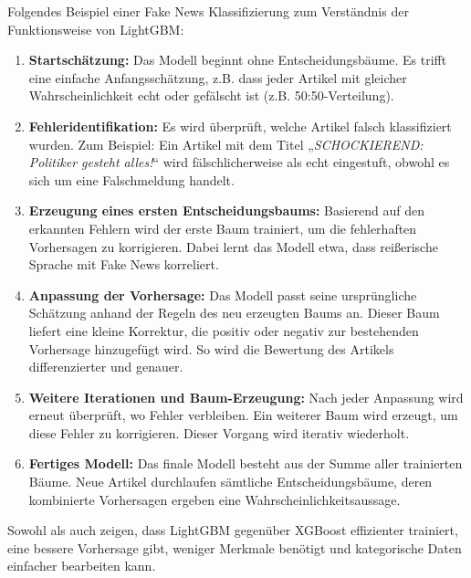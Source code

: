Folgendes Beispiel einer Fake News Klassifizierung zum Verständnis der Funktionsweise von LightGBM:
\begin{enumerate}
    \item \textbf{Startschätzung:}  
    Das Modell beginnt ohne Entscheidungsbäume. Es trifft eine einfache Anfangsschätzung, z.B. dass jeder Artikel mit gleicher Wahrscheinlichkeit echt 
    oder gefälscht ist (z.B. 50:50-Verteilung).

    \item \textbf{Fehleridentifikation:}  
    Es wird überprüft, welche Artikel falsch klassifiziert wurden. Zum Beispiel: Ein Artikel mit dem Titel „\emph{SCHOCKIEREND: Politiker gesteht alles!}“ 
    wird fälschlicherweise als echt eingestuft, obwohl es sich um eine Falschmeldung handelt.

    \item \textbf{Erzeugung eines ersten Entscheidungsbaums:}  
    Basierend auf den erkannten Fehlern wird der erste Baum trainiert, um die fehlerhaften Vorhersagen zu korrigieren. 
    Dabei lernt das Modell etwa, dass reißerische Sprache mit Fake News korreliert.

    \item \textbf{Anpassung der Vorhersage:}  
    Das Modell passt seine ursprüngliche Schätzung anhand der Regeln des neu erzeugten Baums an. Dieser Baum liefert eine kleine Korrektur, die
    positiv oder negativ zur bestehenden Vorhersage hinzugefügt wird. So wird die Bewertung des Artikels differenzierter und genauer.

    \item \textbf{Weitere Iterationen und Baum-Erzeugung:}  
    Nach jeder Anpassung wird erneut überprüft, wo Fehler verbleiben. Ein weiterer Baum wird erzeugt, um diese Fehler zu korrigieren. 
    Dieser Vorgang wird iterativ wiederholt.

    \item \textbf{Fertiges Modell:}  
    Das finale Modell besteht aus der Summe aller trainierten Bäume. Neue Artikel durchlaufen sämtliche Entscheidungsbäume, 
    deren kombinierte Vorhersagen ergeben eine Wahrscheinlichkeitsaussage.
\end{enumerate}

Sowohl \cite{ke2017} als auch \cite{hu2020} zeigen, dass LightGBM gegenüber XGBoost effizienter trainiert, eine bessere Vorhersage gibt, weniger
Merkmale benötigt und kategorische Daten einfacher bearbeiten kann.